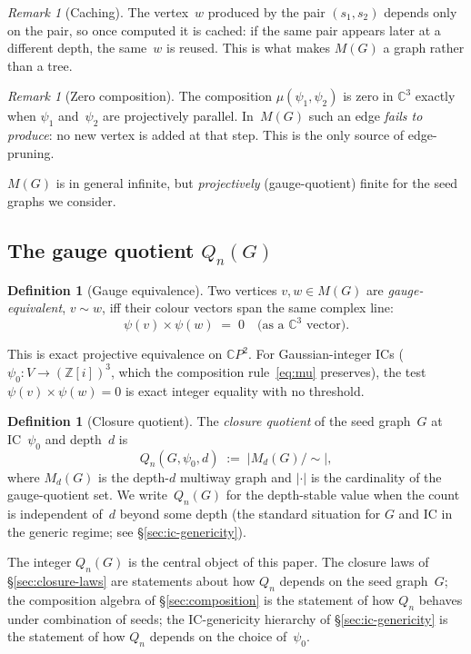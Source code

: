 \documentclass[12pt,a4paper]{article}
\theoremstyle{definition}
\newtheorem{definition}[theorem]{Definition}
\theoremstyle{remark}
\newtheorem{remark}[theorem]{Remark}
\newcommand{\bZ}{\mathbb{Z}}
\newcommand{\bC}{\mathbb{C}}
\newcommand{\Qn}{Q_n}
\begin{document}
\begin{remark}[Caching]\label{rem:cache}
The vertex~$w$ produced by the pair $(s_1, s_2)$ depends only on the
pair, so once computed it is cached: if the same pair appears later
at a different depth, the same~$w$ is reused. This is what makes
$M(G)$ a graph rather than a tree.
\end{remark}

\begin{remark}[Zero composition]\label{rem:zerocomp}
The composition $\mu(\psi_1, \psi_2)$ is zero in $\bC^3$ exactly when
$\psi_1$ and~$\psi_2$ are projectively parallel. In~$M(G)$ such an
edge \emph{fails to produce}: no new vertex is added at that step.
This is the only source of edge-pruning.
\end{remark}

$M(G)$ is in general infinite, but \emph{projectively} (gauge-quotient)
finite for the seed graphs we consider.

\subsection{The gauge quotient $\Qn(G)$}
\label{sec:bg-quotient}

\begin{definition}[Gauge equivalence]\label{def:gauge}
Two vertices $v, w \in M(G)$ are \emph{gauge-equivalent},
$v \sim w$, iff their colour vectors span the same complex line:
\[
\psi(v) \times \psi(w) \;=\; 0 \quad \text{(as a $\bC^3$ vector).}
\]
\end{definition}

This is exact projective equivalence on $\bC P^2$. For
Gaussian-integer ICs ($\psi_0 : V \to (\bZ[i])^3$, which the
composition rule~\eqref{eq:mu} preserves), the test $\psi(v) \times
\psi(w) = 0$ is exact integer equality with no threshold.

\begin{definition}[Closure quotient]\label{def:closurequotient}
The \emph{closure quotient} of the seed graph~$G$ at IC~$\psi_0$ and
depth~$d$ is
\[
\Qn(G, \psi_0, d) \;:=\; \big| M_d(G) / {\sim} \big|,
\]
where $M_d(G)$ is the depth-$d$ multiway graph and $|\cdot|$ is the
cardinality of the gauge-quotient set. We write~$\Qn(G)$ for the
depth-stable value when the count is independent of~$d$ beyond some
depth (the standard situation for $G$ and IC in the generic regime;
see \S\ref{sec:ic-genericity}).
\end{definition}

The integer $\Qn(G)$ is the central object of this paper. The closure
laws of \S\ref{sec:closure-laws} are statements about how $\Qn$
depends on the seed graph~$G$; the composition algebra of
\S\ref{sec:composition} is the statement of how $\Qn$ behaves under
combination of seeds; the IC-genericity hierarchy of
\S\ref{sec:ic-genericity} is the statement of how $\Qn$ depends on the
choice of~$\psi_0$.
\end{document}
